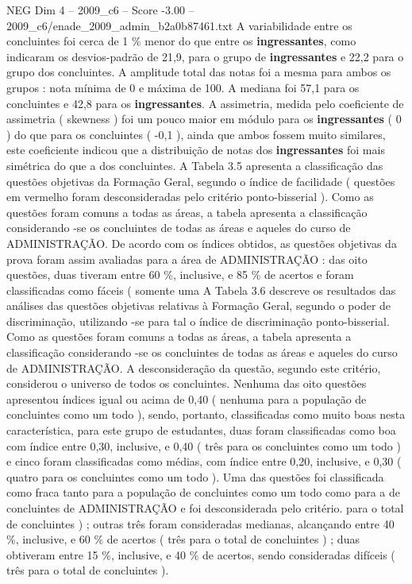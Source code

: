 \begin{textsample}{NEG Dim 4 – 2009\_c6 – Score -3.00 – 2009\_c6/enade\_2009\_admin\_b2a0b87461.txt}
A variabilidade entre os concluintes foi cerca de 1 \% menor do que entre os \textbf{ingressantes}, como indicaram os desvios-padrão de 21,9, para o grupo de \textbf{ingressantes} e 22,2 para o grupo dos concluintes.
A amplitude total das notas foi a mesma para ambos os grupos : nota mínima de 0 e máxima de 100.
A mediana foi 57,1 para os concluintes e 42,8 para os \textbf{ingressantes}.
A assimetria, medida pelo coeficiente de assimetria ( skewness ) foi um pouco maior em módulo para os \textbf{ingressantes} ( 0 ) do que para os concluintes ( -0,1 ), ainda que ambos fossem muito similares, este coeficiente indicou que a distribuição de notas dos \textbf{ingressantes} foi mais simétrica do que a dos concluintes.
A Tabela 3.5 apresenta a classificação das questões objetivas da Formação Geral, segundo o índice de facilidade ( questões em vermelho foram desconsideradas pelo critério ponto-bisserial ).
Como as questões foram comuns a todas as áreas, a tabela apresenta a classificação considerando -se os concluintes de todas as áreas e aqueles do curso de ADMINISTRAÇÃO.
De acordo com os índices obtidos, as questões objetivas da prova foram assim avaliadas para a área de ADMINISTRAÇÃO : das oito questões, duas tiveram entre 60 \%, inclusive, e 85 \% de acertos e foram classificadas como fáceis ( somente uma A Tabela 3.6 descreve os resultados das análises das questões objetivas relativas à Formação Geral, segundo o poder de discriminação, utilizando -se para tal o índice de discriminação ponto-bisserial.
Como as questões foram comuns a todas as áreas, a tabela apresenta a classificação considerando -se os concluintes de todas as áreas e aqueles do curso de ADMINISTRAÇÃO.
A desconsideração da questão, segundo este critério, considerou o universo de todos os concluintes.
Nenhuma das oito questões apresentou índices igual ou acima de 0,40 ( nenhuma para a população de concluintes como um todo ), sendo, portanto, classificadas como muito boas nesta característica, para este grupo de estudantes, duas foram classificadas como boa com índice entre 0,30, inclusive, e 0,40 ( três para os concluintes como um todo ) e cinco foram classificadas como médias, com índice entre 0,20, inclusive, e 0,30 ( quatro para os concluintes como um todo ).
Uma das questões foi classificada como fraca tanto para a população de concluintes como um todo como para a de concluintes de ADMINISTRAÇÃO e foi desconsiderada pelo critério. para o total de concluintes ) ; outras três foram consideradas medianas, alcançando entre 40 \%, inclusive, e 60 \% de acertos ( três para o total de concluintes ) ; duas obtiveram entre 15 \%, inclusive, e 40 \% de acertos, sendo consideradas difíceis ( três para o total de concluintes ).

\end{textsample}
